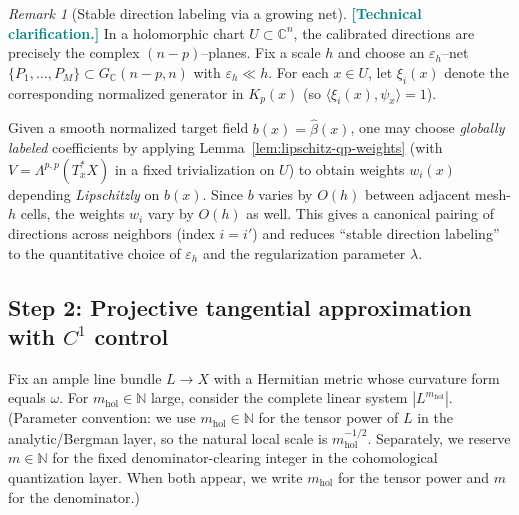 \documentclass[11pt]{article}
\newcommand{\REVMZ}[1]{\textcolor{teal}{#1}}  %
\numberwithin{equation}{section}  %
\theoremstyle{plain}
\theoremstyle{definition}
\theoremstyle{remark}
\newtheorem{remark}[theorem]{Remark}
\newcommand{\C}{\mathbb{C}}
\newcommand{\N}{\mathbb{N}}
\newcommand{\mhol}{m_{\mathrm{hol}}} %
\begin{document}
\begin{remark}[Stable direction labeling via a growing net]\label{rem:direction-net-qp}
\REVMZ{\textbf{[Technical clarification.]}}
In a holomorphic chart $U\subset\C^n$, the calibrated directions are precisely the complex $(n-p)$--planes.
Fix a scale $h$ and choose an $\varepsilon_h$--net $\{P_1,\dots,P_M\}\subset G_{\C}(n-p,n)$ with $\varepsilon_h\ll h$.
For each $x\in U$, let $\xi_i(x)$ denote the corresponding normalized generator in $K_p(x)$ (so $\langle \xi_i(x),\psi_x\rangle=1$).

\smallskip\noindent
Given a smooth normalized target field $b(x)=\widehat\beta(x)$, one may choose \emph{globally labeled} coefficients by applying
Lemma~\ref{lem:lipschitz-qp-weights} (with $V=\Lambda^{p,p}(T_x^*X)$ in a fixed trivialization on $U$) to obtain
weights $w_i(x)$ depending \emph{Lipschitzly} on $b(x)$.  Since $b$ varies by $O(h)$ between adjacent mesh-$h$ cells,
the weights $w_i$ vary by $O(h)$ as well.  This gives a canonical pairing of directions across neighbors (index $i=i'$)
and reduces ``stable direction labeling'' to the quantitative choice of $\varepsilon_h$ and the regularization parameter $\lambda$.
\end{remark}


\subsection*{Step 2: Projective tangential approximation with $C^1$ control}

Fix an ample line bundle $L\to X$ with a Hermitian metric whose curvature
form equals $\omega$.  For $\mhol\in\N$ large, consider the complete linear
system $|L^{\mhol}|$.
(Parameter convention: we use $\mhol\in\N$ for the tensor power of $L$ in the analytic/Bergman layer, so the natural local scale is $\mhol^{-1/2}$. Separately, we reserve $m\in\N$ for the fixed denominator-clearing integer in the cohomological quantization layer. When both appear, we write $\mhol$ for the tensor power and $m$ for the denominator.)
\end{document}
